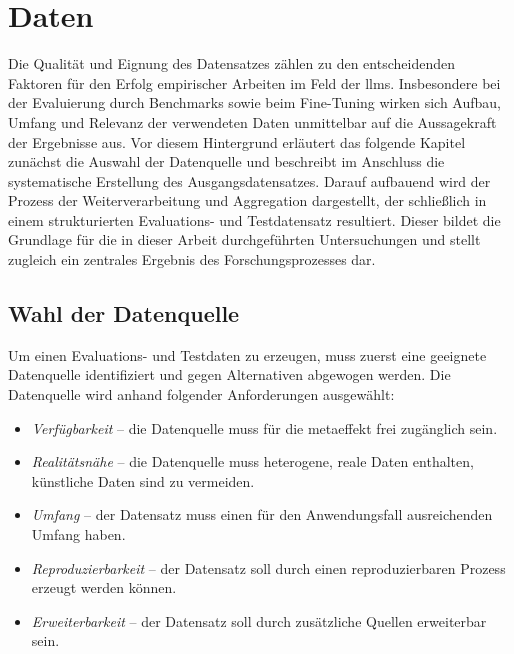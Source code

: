\chapter{Daten}\label{ch:daten}

Die Qualität und Eignung des Datensatzes zählen zu den entscheidenden Faktoren für den Erfolg empirischer Arbeiten im Feld der \glspl{llm}.
Insbesondere bei der Evaluierung durch Benchmarks sowie beim Fine-Tuning wirken sich Aufbau, Umfang und Relevanz der verwendeten Daten unmittelbar auf die Aussagekraft der Ergebnisse aus.
Vor diesem Hintergrund erläutert das folgende Kapitel zunächst die Auswahl der Datenquelle und beschreibt im Anschluss die systematische Erstellung des Ausgangsdatensatzes.
Darauf aufbauend wird der Prozess der Weiterverarbeitung und Aggregation dargestellt, der schließlich in einem strukturierten Evaluations- und Testdatensatz resultiert.
Dieser bildet die Grundlage für die in dieser Arbeit durchgeführten Untersuchungen und stellt zugleich ein zentrales Ergebnis des Forschungsprozesses dar.


\section{Wahl der Datenquelle}\label{sec:wahl-der-datenquelle}

Um einen Evaluations- und Testdaten zu erzeugen, muss zuerst eine geeignete Datenquelle identifiziert und gegen Alternativen abgewogen werden.
Die Datenquelle wird anhand folgender Anforderungen ausgewählt:

\begin{itemize}
    \item \textit{Verfügbarkeit} -- die Datenquelle muss für die metaeffekt frei zugänglich sein.
    \item \textit{Realitätsnähe} -- die Datenquelle muss heterogene, reale Daten enthalten, künstliche Daten sind zu vermeiden.
    \item \textit{Umfang} -- der Datensatz muss einen für den Anwendungsfall ausreichenden Umfang haben.
    \item \textit{Reproduzierbarkeit} -- der Datensatz soll durch einen reproduzierbaren Prozess erzeugt werden können.
    \item \textit{Erweiterbarkeit} -- der Datensatz soll durch zusätzliche Quellen erweiterbar sein.
\end{itemize}

